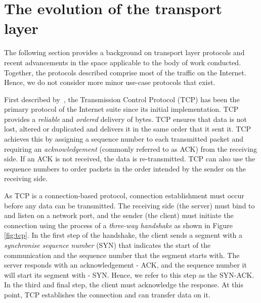 \section{The evolution of the transport layer}

The following section provides a background on transport layer protocols and recent advancements in the space applicable to the body of work conducted.
Together, the protocols described comprise most of the traffic on the Internet.
Hence, we do not consider more minor use-case protocols that exist.

First described by~\citet{cerf_protocol_1974}, the Transmission Control Protocol (TCP) has been the primary protocol of the Internet suite since its initial implementation.
TCP provides a \textit{reliable} and \textit{ordered} delivery of bytes.
TCP ensures that data is not lost, altered or duplicated and delivers it in the same order that it sent it.
TCP achieves this by assigning a sequence number to each transmitted packet and requiring an \textit{acknowledgement} (commonly referred to as ACK) from the receiving side.
If an ACK is not received, the data is re-transmitted.
TCP can also use the sequence numbers to order packets in the order intended by the sender on the receiving side.

As TCP is a connection-based protocol, connection establishment must occur before any data can be transmitted.
The receiving side (the server) must bind to and listen on a network port, and the sender (the client) must initiate the connection using the process of a \textit{three-way handshake} as shown in Figure \ref{fig:tcp}.
In the first step of the handshake, the client sends a segment with a \textit{synchronise sequence number} (SYN) that indicates the start of the communication and the sequence number that the segment starts with.
The server responds with an acknowledgement - ACK, and the sequence number it will start its segment with - SYN.
Hence, we refer to this step as the SYN-ACK.
In the third and final step, the client must acknowledge the response.
At this point, TCP establishes the connection and can transfer data on it.

